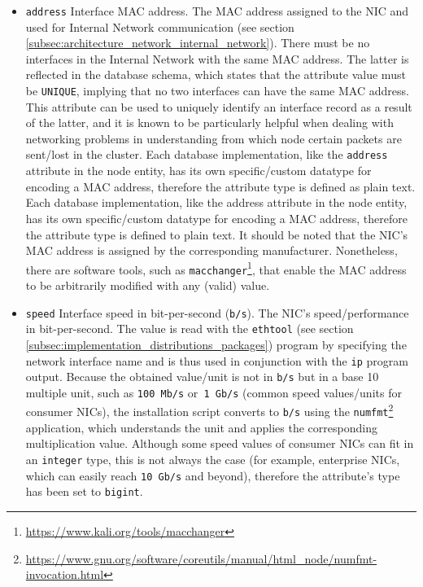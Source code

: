 \begin{itemize}
  \item \texttt{address}
    \newline
    Interface MAC address.
    \newline
    The MAC address assigned to the NIC and used for Internal Network communication
    (see section \ref{subsec:architecture_network_internal_network}). There must
    be no interfaces in the Internal Network with the same MAC address. The latter
    is reflected in the database schema, which states that the attribute value
    must be \texttt{UNIQUE}, implying that no two interfaces can have the same
    MAC address. This attribute can be used to uniquely identify an interface record
    as a result of the latter, and it is known to be particularly helpful when
    dealing with networking problems in understanding from which node certain
    packets are sent/lost in the cluster.
    \newline
    Each database implementation, like the \texttt{address} attribute in the node
    entity, has its own specific/custom datatype for encoding a MAC address, therefore
    the attribute type is defined as plain text.
    \newline
    Each database implementation, like the address attribute in the node entity,
    has its own specific/custom datatype for encoding a MAC address, therefore the
    attribute type is defined to plain text.
    \newline
    It should be noted that the NIC's MAC address is assigned by the
    corresponding manufacturer. Nonetheless, there are software tools, such as \texttt{macchanger}\footnote{\url{https://www.kali.org/tools/macchanger}},
    that enable the MAC address to be arbitrarily modified with any (valid) value.

  \item \texttt{speed}
    \newline
    Interface speed in bit-per-second (\texttt{b/s}).
    \newline
    The NIC's speed/performance in bit-per-second. The value is read with the \texttt{ethtool}
    (see section \ref{subsec:implementation_distributions_packages}) program by
    specifying the network interface name and is thus used in conjunction with
    the \texttt{ip} program output. Because the obtained value/unit is not in
    \texttt{b/s} but in a base 10 multiple unit, such as \texttt{100 Mb/s} or\texttt{
    1 Gb/s} (common speed values/units for consumer NICs), the installation script
    converts to \texttt{b/s} using the \texttt{numfmt}\footnote{\url{https://www.gnu.org/software/coreutils/manual/html_node/numfmt-invocation.html}}
    application, which understands the unit and applies the corresponding
    multiplication value.
    \newline
    Although some speed values of consumer NICs can fit in an \texttt{integer}
    type, this is not always the case (for example, enterprise NICs, which can
    easily reach \texttt{10 Gb/s} and beyond), therefore the attribute's type has
    been set to \texttt{bigint}.


\end{itemize}
